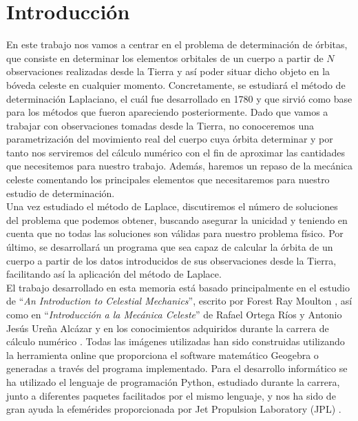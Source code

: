 
\chapter{Introducción}
\label{chap:introduction}
En este trabajo nos vamos a centrar en el problema de determinación de órbitas, que consiste en determinar los elementos orbitales de un cuerpo a partir de $N$ observaciones realizadas desde la Tierra y así poder situar dicho objeto en la bóveda celeste en cualquier momento. Concretamente, se estudiará el método de determinación Laplaciano, el cuál fue desarrollado en 1780 y que sirvió como base para los métodos que fueron apareciendo posteriormente.	Dado que vamos a trabajar con observaciones tomadas desde la Tierra, no conoceremos una parametrización del movimiento real del cuerpo cuya órbita determinar y por tanto nos serviremos del cálculo numérico con el fin de aproximar las cantidades que necesitemos para nuestro trabajo. Además, haremos un repaso de la mecánica celeste comentando los principales elementos que necesitaremos para nuestro estudio de determinación.\\

Una vez estudiado el método de Laplace, discutiremos el número de soluciones del problema que podemos obtener, buscando asegurar la unicidad y teniendo en cuenta que no todas las soluciones son válidas para nuestro problema físico. Por último, se desarrollará un programa que sea capaz de calcular la órbita de un cuerpo a partir de los datos introducidos de sus observaciones desde la Tierra, facilitando así la aplicación del método de Laplace.\\

El trabajo desarrollado en esta memoria está basado principalmente en el estudio de ``\textit{An Introduction to Celestial Mechanics}'', escrito por Forest Ray Moulton \cite{moulton}, así como en ``\textit{Introducción a la Mecánica Celeste}'' de Rafael Ortega Ríos y Antonio Jesús Ureña Alcázar \cite{ortega} y en los conocimientos adquiridos durante la carrera de cálculo numérico \cite{MNII}. Todas las imágenes utilizadas han sido construidas utilizando la herramienta online que proporciona el software matemático Geogebra \cite{geogebra} o generadas a través del programa implementado. Para el desarrollo informático se ha utilizado el lenguaje de programación Python, estudiado durante la carrera, junto a diferentes paquetes facilitados por el mismo lenguaje, y nos ha sido de gran ayuda la efemérides proporcionada por Jet Propulsion Laboratory (JPL) \cite{jpl}.\\

